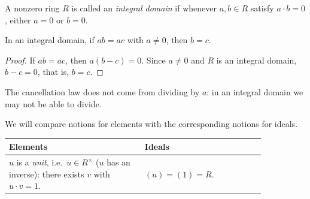 \documentclass[reqno,11pt]{amsart}
\begin{document}
\begin{define}
A nonzero ring $R$ is called an \emph{integral domain} if whenever $a,b\in R$
satisfy $a\cdot b=0$, either $a=0$ or $b=0$.
\end{define}

\begin{proposition}\label{prop:cancellation}
In an integral domain, if $ab=ac$ with $a\neq0$, then $b=c$.
\end{proposition}
\begin{proof}
If $ab=ac$, then $a(b-c)=0$. Since $a\neq0$ and $R$ is an integral
domain, $b-c=0$, that is, $b=c$.
\end{proof}

\begin{warningbox}
The cancellation law does not come from dividing by $a$:
in an integral domain we may not be able to divide.
\end{warningbox}

We will compare notions for elements with the corresponding notions
for ideals.

\begin{center}
\begin{tabular}{p{0.45\linewidth}|p{0.4\linewidth}}
  \textbf{Elements} & \textbf{Ideals}\\ \hline
  \rule{0pt}{2.6ex}%
  $u$ is a \emph{unit}, i.e.\ $u\in R^\times$ ($u$ has an inverse):
  there exists $v$ with $u\cdot v=1$.
  & $(u)=(1)=R$.
\end{tabular}
\end{center}
\end{document}
